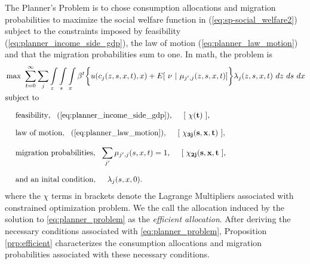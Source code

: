 \documentclass[12pt,pdftex]{article}
\begin{document}
\begin{onehalfspacing}
The Planner's Problem is to chose consumption allocations and migration probabilities to maximize the social welfare function in (\ref{eq:sp-social_welfare2}) subject to the constraints imposed by feasibility (\ref{eq:planner_income_side_gdp}), the law of motion (\ref{eq:planner_law_motion}) and that the migration probabilities sum to one. In math, the problem is
\begin{align}
\small
& \max \ \sum_{t=0}^{\infty}\sum_{j} \int\limits_{z} \int\limits_{s} \int\limits_{x} \beta^{t} \bigg \{ u(c_{j}(z, s, x, t), x) + E[\ \nu \ | \ \mu_{j',j}(z, s,x,t)] \bigg \} \lambda_{j}(z, s, x, t) \ dz \ ds \ dx \label{eq:planner_problem} \\
& \mbox{subject to} \nonumber\\[.75em]
& \ \ \ \ \mbox{feasibility}, \ \ (\ref{eq:planner_income_side_gdp}), \ \ \ \ [\ \mathbf{\chi(t)} \ ], \nonumber \\[.75em]
& \ \ \ \ \mbox{law of motion}, \ \ (\ref{eq:planner_law_motion}), \ \ \ \ [\ \mathbf{\chi_{3j}(s, x, t)} \ ], \nonumber \\[.75em]
& \ \ \ \ \mbox{migration probabilities}, \ \ \sum_{j'} \mu_{j',j}(s,x,t) = 1,  \ \ \ \ [\ \mathbf{\chi_{2j}(s, x, t} \ ], \nonumber \\[.75em]
& \ \ \ \ \mbox{and an inital condition}, \ \ \ \ \lambda_j(s, x,0). \nonumber
\end{align}
where the $\chi$ terms in brackets denote the Lagrange Multipliers associated with constrained optimization problem. We the call the allocation induced by the solution to \ref{eq:planner_problem} as the \emph{efficient allocation}. After deriving the necessary conditions associated with \ref{eq:planner_problem}, Proposition \ref{prp:efficient} characterizes the consumption allocations and migration probabilities associated with these necessary conditions.


\end{onehalfspacing}
\end{document}
